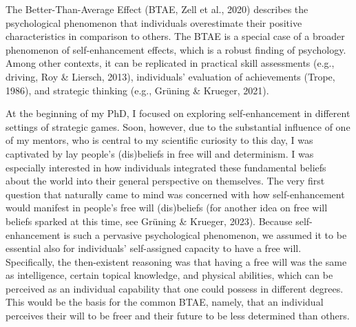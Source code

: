 \documentclass[authordate, anecdote]{jote-new-article}
\author[1]{\mbox{David Grüning\orcid{0000-0002-9274-5477}}}
\affil[1]{Heidelberg}
\begin{document}
\begin{frontmatter}
  \maketitle
  \begin{abstract}
    \printabstracttext
  \end{abstract}
\end{frontmatter}







	The Better-Than-Average Effect (BTAE, Zell et al., 2020) describes the psychological phenomenon that individuals overestimate their positive characteristics in comparison to others. The BTAE is a special case of a broader phenomenon of self-enhancement effects, which is a robust finding of psychology. Among other contexts, it can be replicated in practical skill assessments (e.g., driving, Roy \& Liersch, 2013), individuals' evaluation of achievements (Trope, 1986), and strategic thinking (e.g., Grüning \& Krueger, 2021).



	At the beginning of my PhD, I focused on exploring self-enhancement in different settings of strategic games. Soon, however, due to the substantial influence of one of my mentors, who is central to my scientific curiosity to this day, I was captivated by lay people's (dis)beliefs in free will and determinism. I was especially interested in how individuals integrated these fundamental beliefs about the world into their general perspective on themselves. The very first question that naturally came to mind was concerned with how self-enhancement would manifest in people's free will (dis)beliefs (for another idea on free will beliefs sparked at this time, see Grüning \& Krueger, 2023). Because self-enhancement is such a pervasive psychological phenomenon, we assumed it to be essential also for individuals' self-assigned capacity to have a free will. Specifically, the then-existent reasoning was that having a free will was the same as intelligence, certain topical knowledge, and physical abilities, which can be perceived as an individual capability that one could possess in different degrees. This would be the basis for the common BTAE, namely, that an individual perceives their will to be freer and their future to be less determined than others.
\end{document}
